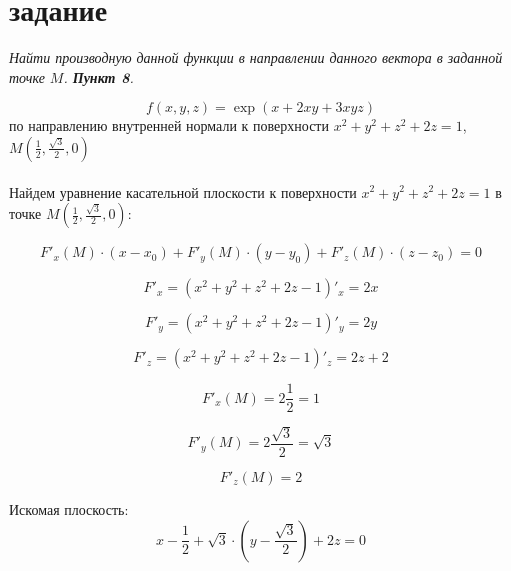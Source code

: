 \documentclass[a5paper, 10pt]{article}
\theoremstyle{definition}
\theoremstyle{plain}
\theoremstyle{remark}
\begin{document}
\section{задание}
\textit{Найти производную данной функции в направлении данного вектора в заданной точке $M$. \textbf{Пункт 8}.}

\begin{equation}
f(x, y, z) = \exp(x + 2xy + 3xyz)
\end{equation}
по направлению внутренней нормали к поверхности $x^2 + y^2 + z^2 + 2z = 1$, $M \left( \frac{1}{2}, \frac{\sqrt{3}}{2}, 0 \right)$\\
\\
Найдем уравнение касательной плоскости к поверхности $x^2 + y^2 + z^2 + 2z = 1$ в точке $M \left( \frac{1}{2}, \frac{\sqrt{3}}{2}, 0 \right)$:

\begin{equation}
F'_x \left( M \right) \cdot (x - x_0) + F'_y \left( M \right) \cdot (y - y_0) + F'_z \left( M \right) \cdot (z - z_0) = 0
\end{equation}

\begin{equation}
F'_x = \left(  x^2 + y^2 + z^2 + 2z - 1 \right)'_x = 2x
\end{equation}

\begin{equation}
F'_y = \left(  x^2 + y^2 + z^2 + 2z - 1 \right)'_y = 2y
\end{equation}

\begin{equation}
F'_z = \left(  x^2 + y^2 + z^2 + 2z - 1 \right)'_z = 2z + 2
\end{equation}

\begin{equation}
F'_x  \left( M \right) = 2 \frac{1}{2} = 1
\end{equation}

\begin{equation}
F'_y  \left( M \right) = 2 \frac{\sqrt{3}}{2} = \sqrt{3}
\end{equation}

\begin{equation}
F'_z  \left( M \right) = 2
\end{equation}

Искомая плоскость:
\begin{equation}
x - \frac{1}{2}  +  \sqrt{3} \cdot (y - \frac{\sqrt{3}}{2}) + 2z= 0
\end{equation}
\end{document}
